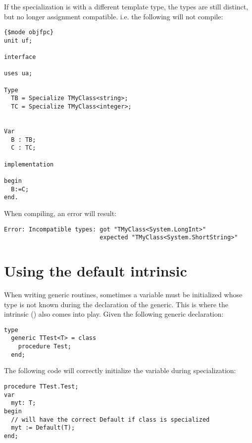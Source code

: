 If the specialization is with a different template type, the types are still distinct, but no longer assignment 
compatible. i.e. the following will not compile:
\begin{verbatim}
{$mode objfpc}
unit uf;

interface

uses ua;

Type
  TB = Specialize TMyClass<string>;
  TC = Specialize TMyClass<integer>;


Var
  B : TB;
  C : TC;
  
implementation

begin
  B:=C;
end.   
\end{verbatim}
When compiling, an error will result:
\begin{verbatim}
Error: Incompatible types: got "TMyClass<System.LongInt>"
                           expected "TMyClass<System.ShortString>"
\end{verbatim}

\section{Using the default intrinsic}
\label{se:genericdefault}
When writing generic routines, sometimes a variable must be initialized whose type is not known during the declaration of the generic.
This is where the  intrinsic () also comes into play. Given the following generic declaration:
\begin{verbatim}
type
  generic TTest<T> = class
    procedure Test;
  end;
\end{verbatim}
The following code will correctly initialize the variable  during specialization:
\begin{verbatim}
procedure TTest.Test;
var
  myt: T;
begin
  // will have the correct Default if class is specialized
  myt := Default(T); 
end;
\end{verbatim}

